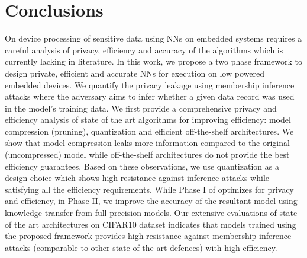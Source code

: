 \section{Conclusions}\label{conclusions}

On device processing of sensitive data using NNs on embedded systems requires a careful analysis of privacy, efficiency and accuracy of the algorithms which is currently lacking in literature.
In this work, we propose a two phase \method\hspace{0.02in} framework to design private, efficient and accurate NNs for execution on low powered embedded devices.
We quantify the privacy leakage using membership inference attacks where the adversary aims to infer whether a given data record was used in the model's training data.
We first provide a comprehensive privacy and efficiency analysis of state of the art algorithms for improving efficiency: model compression (pruning), quantization and efficient off-the-shelf architectures.
We show that model compression leaks more information compared to the original (uncompressed) model while off-the-shelf architectures do not provide the best efficiency guarantees.
Based on these observations, we use quantization as a design choice which shows high resistance against inference attacks while satisfying all the efficiency requirements.
While Phase I of \method\hspace{0.02in} optimizes for privacy and efficiency, in Phase II, we improve the accuracy of the resultant model using knowledge transfer from full precision models.
Our extensive evaluations of state of the art architectures on CIFAR10 dataset indicates that models trained using the proposed framework provides high resistance against membership inference attacks (comparable to other state of the art defences) with high efficiency.
